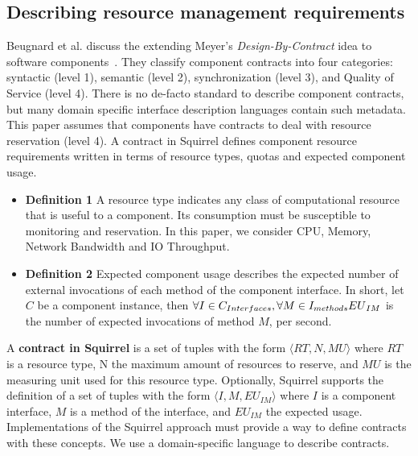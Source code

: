 \subsection{Describing resource management requirements}
Beugnard et al. discuss the extending Meyer's \textit{Design-By-Contract} idea to software components~\cite{Beugnard:1999:MCC:619042.621275}.
They classify component contracts into four categories: syntactic (level 1), semantic (level 2), synchronization (level 3), and Quality of Service (level 4).
There is no de-facto standard to describe component contracts, but many domain specific interface description languages contain such metadata.
This paper assumes that components have contracts to deal with resource reservation (level 4).
A contract in Squirrel defines component resource requirements written in terms of resource types, quotas and expected component usage.
\begin{itemize}
\item{\textbf{Definition 1}} A resource type indicates any class of computational resource that is useful to a component.
Its consumption must be susceptible to monitoring and reservation.
In this paper, we consider CPU, Memory, Network Bandwidth and IO Throughput.

\item{\textbf{Definition 2}} Expected component usage describes the expected number of external invocations of each method of the component interface.
In short, let $C$ be a component instance, then $\forall{I \in C_{Interfaces}}, \forall{M \in I_{methods}} \\ {EU}_{IM}$ is the number of expected invocations of method $M$, per second.

\end{itemize}

A \textbf{contract in Squirrel} is a set of tuples with the form $\langle RT, N, MU \rangle$ where $RT$ is a resource type, N the maximum amount of resources to reserve, and $MU$ is the measuring unit used for this resource type.
Optionally, Squirrel supports the definition of a set of tuples with the form $\langle I, M, {EU}_{IM} \rangle$ where $I$ is a component interface, $M$ is a method of the interface, and ${EU}_{IM}$ the expected usage.
Implementations of the Squirrel approach must provide a way to define contracts with these concepts.
We use a domain-specific language to describe contracts.

